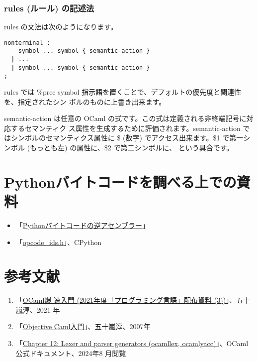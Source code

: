 \documentclass[a4paper,11pt]{jsarticle}
\begin{document}
\subsubsection{rules (ルール) の記述法}

rules の文法は次のようになります。

\begin{lstlisting}
nonterminal :
    symbol ... symbol { semantic-action }
  | ...
  | symbol ... symbol { semantic-action }
;
\end{lstlisting}

rules では \%prec symbol 指示語を置くことで、デフォルトの優先度と関連性を、指定されたシン
ボルのものに上書き出来ます。

semantic-action は任意の OCaml の式です。この式は定義される非終端記号に対応するセマンティク
ス属性を生成するために評価されます。semantic-action ではシンボルのセマンティクス属性に \$
(数字) でアクセス出来ます。\$1 で第一シンボル (もっとも左) の属性に、\$2 で第二シンボルに、
という具合です。

\newpage
\section{Pythonバイトコードを調べる上での資料}

\begin{itemize}
\item 「\href{https://docs.python.org/ja/3/library/dis.html}{Pythonバイトコードの逆アセンブラー}」
\item 「\href{https://github.com/python/cpython/blob/main/Include/opcode_ids.h}{opcode\_ids.h}」、CPython
\end{itemize}



\section{参考文献}

\begin{enumerate}
\item 「\href{https://www.fos.kuis.kyoto-u.ac.jp/~igarashi/class/pl/03-ocaml.pdf}{OCaml爆
    速入門 (2021年度「プログラミング言語」配布資料 (3))}」、五十嵐淳、2021
  年
\item
  「\href{https://www.fos.kuis.kyoto-u.ac.jp/~igarashi/class/isle4-11w/mltext.pdf}{Objective Caml入門}」、五十嵐淳、2007年
\item 「\href{https://ocaml.jp/archive/ocaml-manual-3.06-ja/manual026.html}{Chapter 12:
    Lexer and parser generators (ocamllex, ocamlyacc)}」、OCaml 公式ドキュメント、2024年8
  月閲覧
\end{enumerate}
\end{document}
